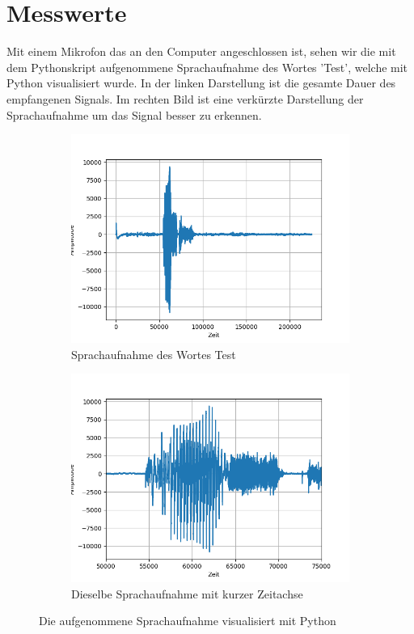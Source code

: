 \documentclass[12pt, oneside, a4paper, \docLanguage]{report}
\begin{document}
\section{Messwerte}
\label{chap:VERSUCH_1_MESSWERTE}
Mit einem Mikrofon das an den Computer angeschlossen ist, sehen wir die mit dem Pythonskript aufgenommene Sprachaufnahme des Wortes 'Test', welche mit Python visualisiert wurde.
In der linken Darstellung ist die gesamte Dauer des empfangenen Signals.
Im rechten Bild ist eine verkürzte Darstellung der Sprachaufnahme um das Signal besser zu erkennen.
\begin{figure}[hbt!]
\centering
	\begin{subfigure}{.5\textwidth}
  		\centering
 		 \includegraphics[width=.95\linewidth]{../data/img/testamp.png}
  		\caption{Sprachaufnahme des Wortes Test}
 		 \label{fig:sub1}
	\end{subfigure}%
	\begin{subfigure}{.5\textwidth}
  		\centering
 		 \includegraphics[width=.95\linewidth]{../data/img/testamp2.png}
  		\caption{Dieselbe Sprachaufnahme mit kurzer Zeitachse}
  		\label{fig:sub2}
	\end{subfigure}
	\caption{Die aufgenommene Sprachaufnahme visualisiert mit Python}
	\label{fig:test}
\end{figure}
\end{document}
